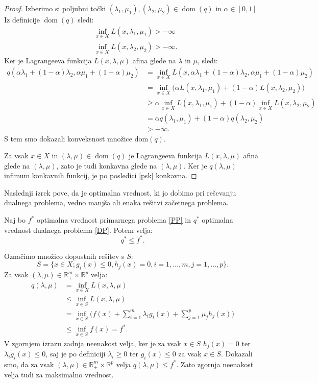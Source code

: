 \documentclass[mat1]{fmfdelo}
\newcommand{\R}{\mathbb R}
\DeclareMathOperator{\dom}{dom}
\begin{document}
\begin{proof}
	Izberimo si poljubni točki $(\lambda_1, \mu_1), (\lambda_2, \mu_2) \in \dom(q)$ in $\alpha \in [0,1]$. Iz definicije $\dom(q)$ sledi: 
	\begin{align*}
	&\inf_{x \in X} L(x, \lambda_1, \mu_1) >- \infty\\
	&\inf_{x \in X} L(x, \lambda_2, \mu_2) >- \infty.
	\end{align*}
	Ker je Lagrangeeva funkcija $L(x, \lambda, \mu)$ afina glede na $\lambda$ in $\mu$, sledi: 
	\begin{align*}
	q(\alpha\lambda_1 + (1-\alpha)\lambda_2, \alpha\mu_1 + (1-\alpha)\mu_2) &= \inf_{x \in X}L(x,\alpha\lambda_1 + (1-\alpha)\lambda_2, \alpha\mu_1 + (1-\alpha)\mu_2 )\\
	&= \inf_{x \in X}\big(\alpha  L(x, \lambda_1, \mu_1) + (1-\alpha)L(x, \lambda_2, \mu_2) \big)\\
	&\ge \alpha \inf_{x \in X}L(x, \lambda_1, \mu_1) + (1-\alpha)\inf_{x \in X}L(x, \lambda_2, \mu_2)\\
	&=\alpha q(\lambda_1, \mu_1) + (1-\alpha)q(\lambda_2, \mu_2)\\
	&>-\infty.
	\end{align*}
	S tem smo dokazali konveksnost množice $\text{dom}(q).$
	
	Za vsak $x\in X$ in $(\lambda, \mu) \in \dom(q) $ je Lagrangeeva funkcija $L(x, \lambda, \mu)$ afina glede na $(\lambda, \mu)$, zato je tudi konkavna glede na $(\lambda, \mu)$. Ker je $q(\lambda, \mu)$ infimum konkavnih funkcij, je po posledici \ref{psk} konkavna. 
\end{proof}

Naslednji izrek pove, da je optimalna vrednost, ki jo dobimo pri reševanju dualnega problema, vedno manjša ali enaka rešitvi začetnega problema. 


\begin{izrek}
	Naj bo $f^*$ optimalna vrednost primarnega problema \eqref{PP} in $q^*$ optimalna vrednost dualnega problema \eqref{DP}. Potem velja:
	$$ q^* \le f^*.$$
\end{izrek}

\begin{dokaz}
	Označimo množico dopustnih rešitev s $S:$
	$$ S = \{x \in X; g_i(x) \le 0, h_j(x) = 0, i = 1, \ldots, m, j = 1, \ldots, p \}.$$
	Za vsak $(\lambda, \mu) \in \R_+^m \times \R^p$ velja: 
	\begin{align*}
	q(\lambda, \mu) &= \inf_{x \in X} L (x, \lambda, \mu) \\
	&\le \inf_{x \in S} L (x, \lambda, \mu)\\
	&= \inf_{x \in S} \Big(f(x)  + \sum_{i=1}^{m}\lambda_ig_i(x) + \sum_{j=1}^{p}\mu_jh_j(x) \Big)\\
	&\le \inf_{x \in S} f(x) = f^*.
	\end{align*}
	V zgornjem izrazu zadnja neenakost velja, ker je za vsak $x \in S$ $h_j(x) = 0$ ter $\lambda_ig_i(x) \le 0$, saj je po definiciji $\lambda_i \ge 0$ ter $g_i(x) \le 0$  za vsak $x \in S.$ 
	Dokazali smo, da za vsak $(\lambda, \mu) \in \R_+^m \times \R^p$ velja $q(\lambda, \mu) \le f^*$. Zato zgornja neenakost velja tudi za maksimalno vrednost. 
\end{dokaz}
\end{document}
